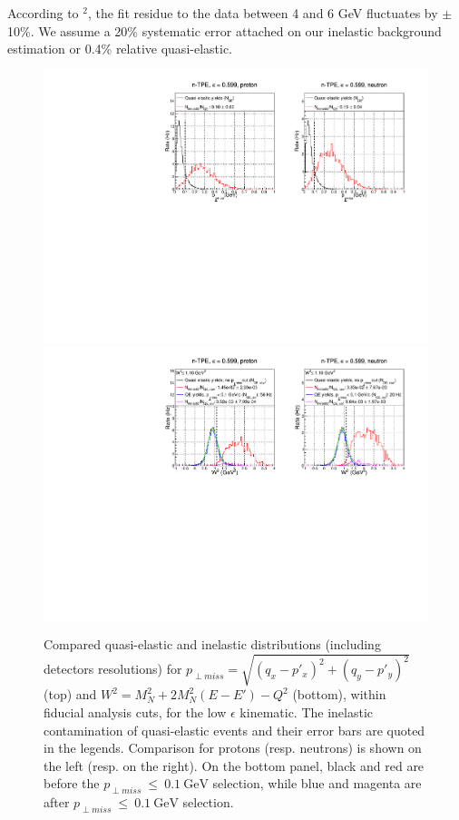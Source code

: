 \documentclass[11pt]{article}
\begin{document}
According to $^2$, %
the fit residue to the data between 4 and 6 GeV fluctuates by $\pm$ 10\%. We assume a 20\% systematic error attached on our inelastic background estimation or 0.4\% relative quasi-elastic.\\
%
\begin{figure}[h]
  \centering
    \includegraphics[width=12cm]{gen-tpe_le_pperp_acc_real.pdf}
    \includegraphics[width=12cm]{gen-tpe_le_W2_acc_real.pdf}
    \caption{Compared quasi-elastic and inelastic distributions (including detectors resolutions) for $p_{\perp miss} = \sqrt{(q_{x}-p'_{x})^2+(q_{y}-p'_{y})^2}$ (top) and $W^2 = M_{N}^2+2M_{N}^{2}(E-E')-Q^2$ (bottom), within fiducial analysis cuts, for the low $\epsilon$ kinematic. The inelastic contamination of quasi-elastic events and their error bars are quoted in the legends. Comparison for protons (resp. neutrons) is shown on the left (resp. on the right). On the bottom panel, black and red are before the $p_{\perp miss}~\leq~0.1~\mathrm{GeV}$ selection, while blue and magenta are after $p_{\perp miss}~\leq~0.1~\mathrm{GeV}$ selection.}
    \label{fig:inel_contam_le}
\end{figure}
\end{document}
